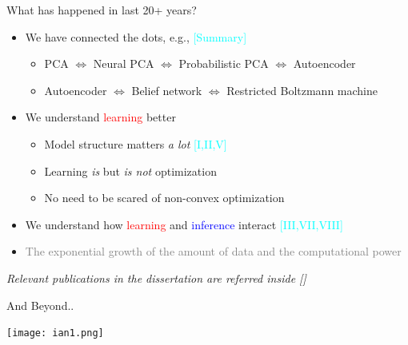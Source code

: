 \documentclass{beamer}
\newcommand{\tred}[1]{\textcolor{red}{#1}}
\newcommand{\tblue}[1]{\textcolor{blue}{#1}}
\begin{document}
\begin{frame}{What has happened in last 20+ years?}
    \begin{itemize}
        \item We have connected the dots, e.g.,
            \textcolor{cyan}{\small [Summary]}
            \begin{itemize}
                \item PCA $\Leftrightarrow$ Neural PCA
                    $\Leftrightarrow$
                    Probabilistic PCA $\Leftrightarrow$ 
                    Autoencoder
                \item Autoencoder $\Leftrightarrow$ Belief
                    network $\Leftrightarrow$ Restricted
                    Boltzmann machine
            \end{itemize}
        \item We understand \tred{learning} better
            \begin{itemize}
                \item Model structure matters \emph{a lot}
                    \textcolor{cyan}{\small [I,II,V]}
                \item Learning \emph{is} but \emph{is not} optimization 
                \item No need to be scared of non-convex
                    optimization
            \end{itemize}
        \item We understand how \tred{learning} and
            \tblue{inference} interact
            \textcolor{cyan}{\small [III,VII,VIII]}
        \item \textcolor{gray}{The exponential growth of the amount of data
            and the computational power}
    \end{itemize}

    \begin{flushright}
        {\it \scriptsize \color{cyan} Relevant publications in the dissertation
    are referred inside []}
    \end{flushright}
\end{frame}


\begin{frame}{And Beyond..}

    \hspace*{-10.5mm}
    \texttt{[image: ian1.png]}

    
\end{frame}
\end{document}
